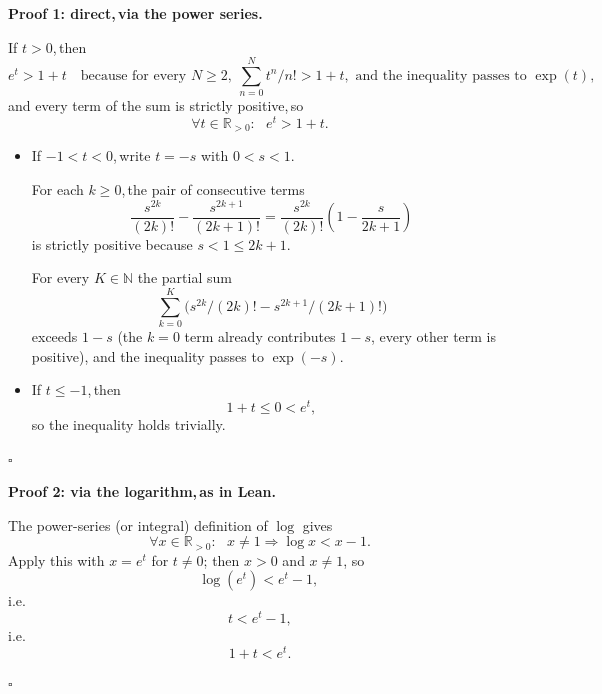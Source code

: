 \documentclass[11pt,reqno]{amsart}
\providecommand{\R}{\mathbb{R}}
\providecommand{\N}{\mathbb{N}}
\theoremstyle{redplain}
\renewcommand{\qedsymbol}{\textcolor{proofqed}{\ensuremath{\square}}}
\renewenvironment{proof}[1][Proof]{\par\noindent\textbf{\textcolor{proofhead}{#1.}}\par\nobreak}{\par\nobreak\hfill\qedsymbol}
\providecommand{\comma}{,\,}
\numberwithin{equation}{section}
\begin{document}
\begin{proof}[Proof 1: direct\comma via the power series]
\noindent If $t>0$\comma then 
\begin{equation*}
e^{t}>1+t\quad \text{because for every }N\geq 2,\ \sum_{n=0}^{N}t^{n}/n!>1+t,%
\text{ and the inequality passes to }\exp (t),
\end{equation*}%
\noindent and every term of the sum is strictly positive\comma so 
\begin{equation*}
\forall t\in \R_{>0}:\text{ }e^{t}>1+t.
\end{equation*}%
\noindent

\begin{itemize}
\item If $-1<t<0$\comma write $t=-s$ with $0<s<1$. \noindent

For each $k\geq 0$\comma the pair of consecutive terms 
\begin{equation*}
\frac{s^{2k}}{(2k)!}-\frac{s^{2k+1}}{(2k+1)!}=\frac{s^{2k}}{(2k)!}\left( 1-%
\frac{s}{2k+1}\right)
\end{equation*}%
\noindent is strictly positive because $s<1\leq 2k+1$. \noindent

For every $K\in \N$ the partial sum%
\begin{equation*}
\sum_{k=0}^{K}\bigl(s^{2k}/(2k)!-s^{2k+1}/(2k+1)!\bigr)
\end{equation*}%
exceeds $1-s$ (the $k=0$ term already contributes $1-s$, every other term is
positive), and the inequality passes to $\exp (-s)$.

\item \noindent If $t\leq -1$\comma then 
\begin{equation*}
1+t\leq 0<e^{t},
\end{equation*}%
so the inequality holds trivially.
\end{itemize}
\end{proof}

\begin{proof}[Proof 2: via the logarithm\comma as in Lean]
\noindent The power-series (or integral) definition of $\log $ gives 
\begin{equation*}
\forall x\in \mathbb{R}_{>0}:\text{ }x\neq 1\Rightarrow \log x<x-1.
\end{equation*}%
\noindent Apply this with $x=e^{t}$ for $t\neq 0$; then $x>0$ and $x\neq 1$,
so 
\begin{equation*}
\log (e^{t})<e^{t}-1\comma
\end{equation*}%
i.e. 
\begin{equation*}
\ t<e^{t}-1\comma
\end{equation*}%
i.e. 
\begin{equation*}
1+t<e^{t}.
\end{equation*}
\end{proof}
\end{document}
